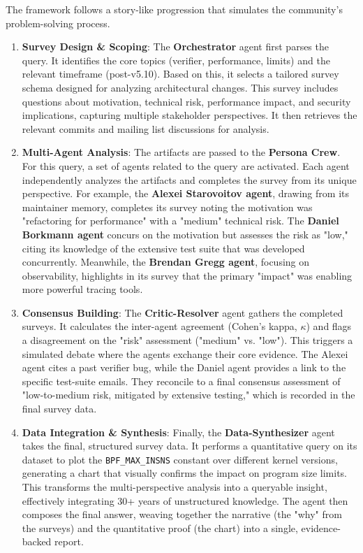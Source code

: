 The framework follows a story-like progression that simulates the community's problem-solving process.

\begin{enumerate}
\item \textbf{Survey Design \& Scoping}: The \textbf{Orchestrator} agent first parses the query. It identifies the core topics (verifier, performance, limits) and the relevant timeframe (post-v5.10). Based on this, it selects a tailored survey schema designed for analyzing architectural changes. This survey includes questions about motivation, technical risk, performance impact, and security implications, capturing multiple stakeholder perspectives. It then retrieves the relevant commits and mailing list discussions for analysis.

\item \textbf{Multi-Agent Analysis}: The artifacts are passed to the \textbf{Persona Crew}. For this query, a set of agents related to the query are activated. Each agent independently analyzes the artifacts and completes the survey from its unique perspective. For example, the \textbf{Alexei Starovoitov agent}, drawing from its maintainer memory, completes its survey noting the motivation was "refactoring for performance" with a "medium" technical risk. The \textbf{Daniel Borkmann agent} concurs on the motivation but assesses the risk as "low," citing its knowledge of the extensive test suite that was developed concurrently. Meanwhile, the \textbf{Brendan Gregg agent}, focusing on observability, highlights in its survey that the primary "impact" was enabling more powerful tracing tools.

\item \textbf{Consensus Building}: The \textbf{Critic-Resolver} agent gathers the completed surveys. It calculates the inter-agent agreement (Cohen's kappa, $\kappa$) and flags a disagreement on the "risk" assessment ("medium" vs. "low"). This triggers a simulated debate where the agents exchange their core evidence. The Alexei agent cites a past verifier bug, while the Daniel agent provides a link to the specific test-suite emails. They reconcile to a final consensus assessment of "low-to-medium risk, mitigated by extensive testing," which is recorded in the final survey data.

\item \textbf{Data Integration \& Synthesis}: Finally, the \textbf{Data-Synthesizer} agent takes the final, structured survey data. It performs a quantitative query on its dataset to plot the \texttt{BPF\_MAX\_INSNS} constant over different kernel versions, generating a chart that visually confirms the impact on program size limits. This transforms the multi-perspective analysis into a queryable insight, effectively integrating 30+ years of unstructured knowledge. The agent then composes the final answer, weaving together the narrative (the "why" from the surveys) and the quantitative proof (the chart) into a single, evidence-backed report.
\end{enumerate}
